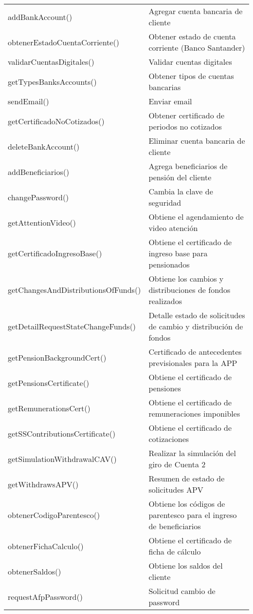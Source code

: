 \begin{longtable}{|p{7cm}|p{8.5cm}|}
    addBankAccount() & Agregar cuenta bancaria de cliente \\
    obtenerEstadoCuentaCorriente() & Obtener estado de cuenta corriente (Banco Santander) \\
    validarCuentasDigitales() & Validar cuentas digitales \\
    getTypesBanksAccounts() & Obtener tipos de cuentas bancarias \\
    sendEmail() & Enviar email \\
    getCertificadoNoCotizados() & Obtener certificado de periodos no cotizados \\
    deleteBankAccount() & Eliminar cuenta bancaria de cliente \\
    addBeneficiarios() & Agrega beneficiarios de pensión del cliente \\
    changePassword() & Cambia la clave de seguridad \\
    getAttentionVideo() & Obtiene el agendamiento de video atención \\ 
    getCertificadoIngresoBase() & Obtiene el certificado de ingreso base para pensionados \\
    getChangesAndDistributionsOfFunds() &	Obtiene los cambios y distribuciones de fondos realizados \\
    getDetailRequestStateChangeFunds() &	Detalle estado de solicitudes de cambio y distribución de fondos \\
    getPensionBackgroundCert() &	Certificado de antecedentes previsionales para la APP \\
    getPensionsCertificate() &	Obtiene el certificado de pensiones \\
    getRemunerationsCert() &	Obtiene el certificado de remuneraciones imponibles \\
    getSSContributionsCertificate() &	Obtiene el certificado de cotizaciones \\
    getSimulationWithdrawalCAV() &	Realizar la simulación del giro de Cuenta 2 \\
    getWithdrawsAPV() &	Resumen de estado de solicitudes APV \\
    obtenerCodigoParentesco() &	Obtiene los códigos de parentesco para el ingreso de beneficiarios \\
    obtenerFichaCalculo() &	Obtiene el certificado de ficha de cálculo \\
    obtenerSaldos() &	Obtiene los saldos del cliente \\
    requestAfpPassword() &	Solicitud cambio de password \\

\end{longtable}
